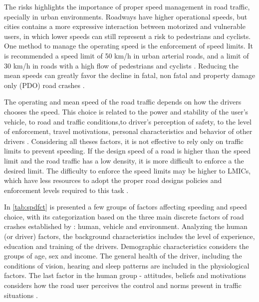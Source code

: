 The risks highlights the importance of proper speed management in road traffic, specially in urban environments. Roadways have higher operational speeds, but cities contains a more expressive interaction between motorized and vulnerable users, in which lower speeds can still represent a risk to pedestrians and cyclists. One method to manage the operating speed is the enforcement of speed limits. It is recommended a speed limit of 50 km/h in urban arterial roads, and a limit of 30 km/h in roads with a high flow of pedestrians and cyclists \cite{WHO2008}. Reducing the mean speeds can greatly favor the decline in fatal, non fatal and property damage only (PDO) road crashes \cite{Elvik2013}. 

The operating and mean speed of the road traffic depends on how the drivers chooses the speed. This choice is related to the power and stability of the user's vehicle, to road and traffic conditions,to  driver's perception of safety, to the level of enforcement, travel motivations, personal characteristics and behavior of other drivers \cite{Mohan2016a, Shinar2017}. Considering all theses factors, it is not effective to rely only on traffic limits to prevent speeding. If the design speed of a road is higher than the speed limit and the road traffic has a low density, it is more difficult to enforce a the desired limit. The difficulty to enforce the speed limits may be higher to LMICs, which have less resources to adopt the proper road designs policies and enforcement levels required to this task \cite{Mohan2016a}. 

In \autoref{tab:spdfct} is presented a few groups of factors affecting speeding and speed choice, with its categorization based on the three main discrete factors of road crashes established by \textcite{Haddon1980}: human, vehicle and environment. Analyzing the human (or driver) factors, the background characteristics includes the level of experience, education and training of the drivers. Demographic characteristics considers the groups of age, sex and income. The general health of the driver, including the conditions of vision, hearing and sleep patterns are included in the physiological factors. The last factor in the human group - attitudes, beliefs and motivations considers how the road user perceives the control and norms present in traffic situations \cite{Richard2013a}.  

